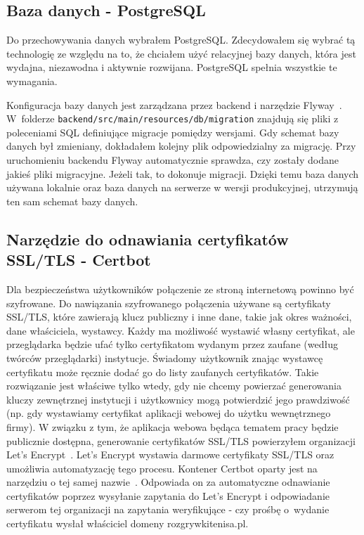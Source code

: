 \documentclass[shortabstract]{iithesis}
\begin{document}
\subsection{Baza danych - PostgreSQL}
Do przechowywania danych wybrałem PostgreSQL.
Zdecydowałem się wybrać tą technologię ze względu na to, że chciałem użyć relacyjnej bazy danych, która jest wydajna, niezawodna i aktywnie rozwijana. PostgreSQL spełnia wszystkie te wymagania.
\par
Konfiguracja bazy danych jest zarządzana przez backend i narzędzie Flyway~\cite{Flyway}.
W~folderze \texttt{backend/src/main/resources/db/migration} znajdują się pliki z poleceniami SQL definiujące migracje pomiędzy wersjami.
Gdy schemat bazy danych był zmieniany, dokładałem kolejny plik odpowiedzialny za migrację. Przy uruchomieniu backendu Flyway automatycznie sprawdza, czy zostały dodane jakieś pliki migracyjne.
Jeżeli tak, to dokonuje migracji.
Dzięki temu baza danych używana lokalnie oraz baza danych na serwerze w wersji produkcyjnej, utrzymują ten sam schemat bazy danych.

\subsection{Narzędzie do odnawiania certyfikatów SSL/TLS - Certbot}
Dla bezpieczeństwa użytkowników połączenie ze stroną internetową powinno być szyfrowane.
Do nawiązania szyfrowanego połączenia używane są certyfikaty SSL/TLS, które zawierają klucz publiczny i inne dane, takie jak okres ważności, dane właściciela, wystawcy.
Każdy ma możliwość wystawić własny certyfikat, ale przeglądarka będzie ufać tylko certyfikatom wydanym przez zaufane (według twórców przeglądarki) instytucje.
Świadomy użytkownik znając wystawcę certyfikatu może ręcznie dodać go do listy zaufanych certyfikatów. Takie rozwiązanie jest właściwe tylko wtedy, gdy nie chcemy powierzać generowania kluczy zewnętrznej instytucji i użytkownicy mogą potwierdzić jego prawdziwość (np. gdy wystawiamy certyfikat aplikacji webowej do użytku wewnętrznego firmy).
W związku z tym, że aplikacja webowa będąca tematem pracy będzie publicznie dostępna, generowanie certyfikatów SSL/TLS powierzyłem organizacji Let's Encrypt~\cite{LetsEncrypt}.
Let's Encrypt wystawia darmowe certyfikaty SSL/TLS oraz umożliwia automatyzację tego procesu.
Kontener Certbot oparty jest na narzędziu o tej samej nazwie~\cite{Certbot}.
Odpowiada on za automatyczne odnawianie certyfikatów poprzez wysyłanie zapytania do Let's Encrypt i odpowiadanie serwerom tej organizacji na zapytania weryfikujące - czy prośbę o~wydanie certyfikatu wysłał właściciel domeny rozgrywkitenisa.pl.
\end{document}
